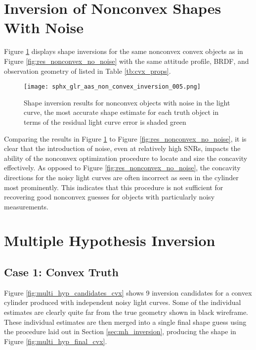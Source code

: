 \clearpage
\section{Inversion of Nonconvex Shapes With Noise}

Figure \ref{fig:res_nonconvex_with_noise} displays shape inversions for the same nonconvex convex objects as in Figure \ref{fig:res_nonconvex_no_noise} with the same attitude profile, BRDF, and observation geometry of listed in Table \ref{tb:cvx_props}.

\begin{figure}[!htb]
  \centering
  \texttt{[image: sphx\_glr\_aas\_non\_convex\_inversion\_005.png]}
  \caption{Shape inversion results for nonconvex objects with noise in the light curve, the most accurate shape estimate for each truth object in terms of the residual light curve error is shaded green}
  \label{fig:res_nonconvex_with_noise}
\end{figure}

Comparing the results in Figure \ref{fig:res_nonconvex_with_noise} to Figure \ref{fig:res_nonconvex_no_noise}, it is clear that the introduction of noise, even at relatively high SNRs, impacts the ability of the nonconvex optimization procedure to locate and size the concavity effectively. As opposed to Figure \ref{fig:res_nonconvex_no_noise}, the concavity directions for the noisy light curves are often incorrect as seen in the cylinder most prominently. This indicates that this procedure is not sufficient for recovering good nonconvex guesses for objects with particularly noisy measurements.

\section{Multiple Hypothesis Inversion}

\subsection{Case 1: Convex Truth}

Figure \ref{fig:multi_hyp_candidates_cvx} shows 9 inversion candidates for a convex cylinder produced with independent noisy light curves. Some of the individual estimates are clearly quite far from the true geometry shown in black wireframe. These individual estimates are then merged into a single final shape guess using the procedure laid out in Section \ref{sec:mh_inversion}, producing the shape in Figure \ref{fig:multi_hyp_final_cvx}.

